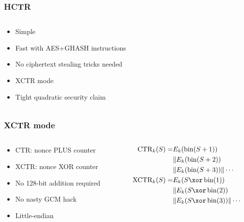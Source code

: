 \documentclass[aspectratio=169]{beamer}
\newenvironment*{figslide}{
    \begin{columns}
        \begin{column}{.4\textwidth}

}{
\end{column}
\begin{column}{.6\textwidth}
    \begin{figure}
        
    \end{figure}
\end{column}
\end{columns}
}
\begin{document}
\begin{frame}

\frametitle{HCTR}

    \begin{figslide}
        \begin{itemize}
            \item Simple
            \item Fast with AES+GHASH instructions
            \item No ciphertext stealing tricks needed
            \item XCTR mode
            \item Tight quadratic security claim
        \end{itemize}
    \end{figslide}
\end{frame}

\begin{frame}
    \frametitle{XCTR mode}
    \begin{columns}
        \begin{column}{.4\textwidth}
            \begin{itemize}
                \item CTR: nonce PLUS counter
                \item XCTR: nonce XOR counter
                \item No 128-bit addition required
                \item No nasty GCM hack
                \item Little-endian
            \end{itemize}
        \end{column}
        \begin{column}{.6\textwidth}
            \begin{align*}
                \operatorname{CTR}_k(S) =& E_k(\fromint(S + 1)) \\
                & \Concat  E_k(\fromint(S + 2)) \\ 
                & \Concat  E_k(\fromint(S + 3)) \Concat \cdots \\
                \XCTR_k(S) =& E_k(S \xor \fromint(1)) \\
                & \Concat  E_k(S \xor \fromint(2)) \\ 
                & \Concat  E_k(S \xor \fromint(3)) \Concat \cdots \\
            \end{align*}
        \end{column}
    \end{columns}
\end{frame}
\end{document}
